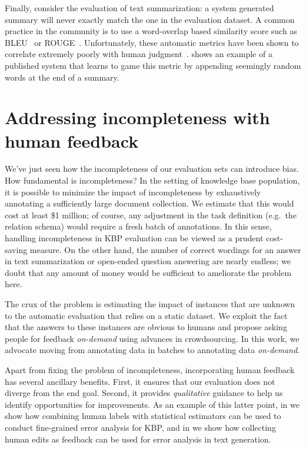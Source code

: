 Finally, consider the evaluation of text summarization: a system generated summary will never exactly match the one in the evaluation dataset.
A common practice in the community is to use a word-overlap based similarity score such as BLEU~\citep{papineni02bleu} or ROUGE~\citep{lin2004rouge}\@.
Unfortunately, these automatic metrics have been shown to correlate extremely poorly with human judgment~\citep{novikova2017why}.
 shows an example of a published system that learns to game this metric by appending seemingly random words at the end of a summary.

\section{Addressing incompleteness with human feedback}
We've just seen how the incompleteness of our evaluation sets can introduce bias.
How fundamental is incompleteness?
In the setting of knowledge base population, it is possible to minimize the impact of incompleteness by exhaustively annotating a sufficiently large document collection.
We estimate that this would cost at least \$1 million; of course, any adjustment in the task definition (e.g.\ the relation schema) would require a fresh batch of annotations.
In this sense, handling incompleteness in KBP evaluation can be viewed as a prudent cost-saving measure.
On the other hand, the number of correct wordings for an answer in text summarization or open-ended question answering are nearly endless; we doubt that any amount of money would be sufficient to ameliorate the problem here.

The crux of the problem is estimating the impact of instances that are unknown to the automatic evaluation that relies on a static dataset.
We exploit the fact that the answers to these instances are obvious to humans and propose asking people for feedback \textit{on-demand} using advances in crowdsourcing. %
In this work, we advocate moving from annotating data in batches to annotating data \textit{on-demand}.

Apart from fixing the problem of incompleteness, incorporating human feedback has several ancillary benefits.
First, it ensures that our evaluation does not diverge from the end goal.
Second, it provides \textit{qualitative} guidance to help us identify opportunities for improvements.
As an example of this latter point, in  we show how combining human labels with statistical estimators can be used to conduct fine-grained error analysis for KBP, and in  we show how collecting human edits as feedback can be used for error analysis in text generation.

